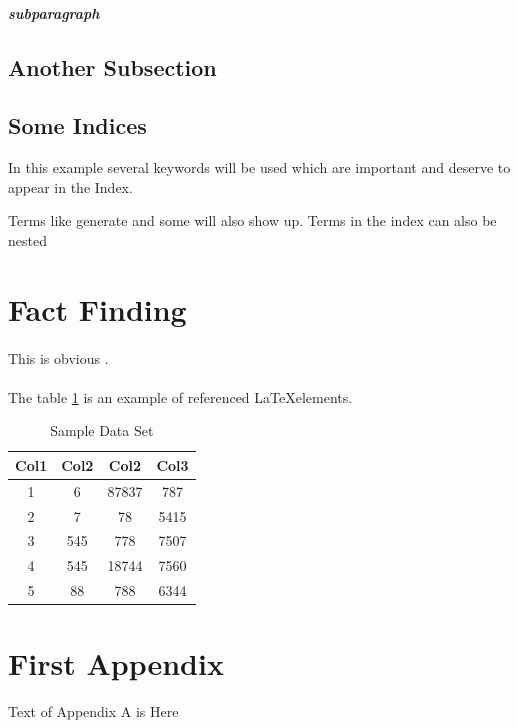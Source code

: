 \documentclass{article}
\begin{document}
        \subparagraph{subparagraph}
        \blindtext
        
        \subsection{Another Subsection}
    		\blindtext
    		
    		\subsection{Some Indices}
	In this example several keywords will be used which are important and deserve to appear in the Index.
 
	Terms like generate and some will also show up. Terms in the index can also be nested 

%
%    
    \newpage
    	\section{Fact Finding}
    	\paragraph{}
	This is obvious \cite{norman}.
	
	\paragraph{}
	The table \ref{table:1} is an example of referenced \LaTeX elements.
 
	\begin{table}[ht]
	\centering
	\begin{tabular}{||c c c c||} 
	\hline
	Col1 & Col2 & Col2 & Col3 \\ [0.5ex] 
	\hline\hline
	1 & 6 & 87837 & 787 \\ 
	2 & 7 & 78 & 5415 \\
	3 & 545 & 778 & 7507 \\
	4 & 545 & 18744 & 7560 \\
	5 & 88 & 788 & 6344 \\ [1ex] 
	\hline
	\end{tabular}
	\caption{Sample Data Set}
	\label{table:1}
	\end{table}

    	\newpage
    	\appendix
    	\section{First Appendix}
	Text of Appendix A is Here
	
\end{document}
